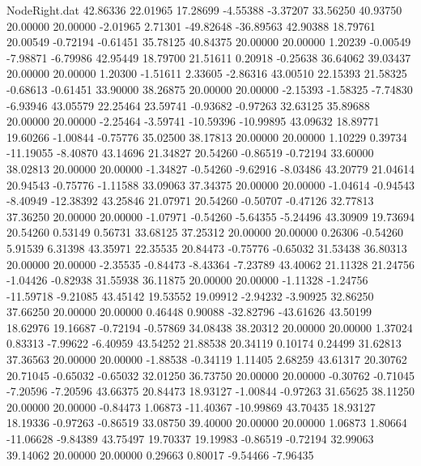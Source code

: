 \begin{filecontents}{NodeRight.dat}
  42.86336   22.01965   17.28699    -4.55388   -3.37207   33.56250   40.93750   20.00000   20.00000   -2.01965    2.71301  -49.82648  -36.89563
  42.90388   18.79761   20.00549    -0.72194   -0.61451   35.78125   40.84375   20.00000   20.00000    1.20239   -0.00549   -7.98871   -6.79986
  42.95449   18.79700   21.51611     0.20918   -0.25638   36.64062   39.03437   20.00000   20.00000    1.20300   -1.51611    2.33605   -2.86316
  43.00510   22.15393   21.58325    -0.68613   -0.61451   33.90000   38.26875   20.00000   20.00000   -2.15393   -1.58325   -7.74830   -6.93946
  43.05579   22.25464   23.59741    -0.93682   -0.97263   32.63125   35.89688   20.00000   20.00000   -2.25464   -3.59741  -10.59396  -10.99895
  43.09632   18.89771   19.60266    -1.00844   -0.75776   35.02500   38.17813   20.00000   20.00000    1.10229    0.39734  -11.19055   -8.40870
  43.14696   21.34827   20.54260    -0.86519   -0.72194   33.60000   38.02813   20.00000   20.00000   -1.34827   -0.54260   -9.62916   -8.03486
  43.20779   21.04614   20.94543    -0.75776   -1.11588   33.09063   37.34375   20.00000   20.00000   -1.04614   -0.94543   -8.40949  -12.38392
  43.25846   21.07971   20.54260    -0.50707   -0.47126   32.77813   37.36250   20.00000   20.00000   -1.07971   -0.54260   -5.64355   -5.24496
  43.30909   19.73694   20.54260     0.53149    0.56731   33.68125   37.25312   20.00000   20.00000    0.26306   -0.54260    5.91539    6.31398
  43.35971   22.35535   20.84473    -0.75776   -0.65032   31.53438   36.80313   20.00000   20.00000   -2.35535   -0.84473   -8.43364   -7.23789
  43.40062   21.11328   21.24756    -1.04426   -0.82938   31.55938   36.11875   20.00000   20.00000   -1.11328   -1.24756  -11.59718   -9.21085
  43.45142   19.53552   19.09912    -2.94232   -3.90925   32.86250   37.66250   20.00000   20.00000    0.46448    0.90088  -32.82796  -43.61626
  43.50199   18.62976   19.16687    -0.72194   -0.57869   34.08438   38.20312   20.00000   20.00000    1.37024    0.83313   -7.99622   -6.40959
  43.54252   21.88538   20.34119     0.10174    0.24499   31.62813   37.36563   20.00000   20.00000   -1.88538   -0.34119    1.11405    2.68259
  43.61317   20.30762   20.71045    -0.65032   -0.65032   32.01250   36.73750   20.00000   20.00000   -0.30762   -0.71045   -7.20596   -7.20596
  43.66375   20.84473   18.93127    -1.00844   -0.97263   31.65625   38.11250   20.00000   20.00000   -0.84473    1.06873  -11.40367  -10.99869
  43.70435   18.93127   18.19336    -0.97263   -0.86519   33.08750   39.40000   20.00000   20.00000    1.06873    1.80664  -11.06628   -9.84389
  43.75497   19.70337   19.19983    -0.86519   -0.72194   32.99063   39.14062   20.00000   20.00000    0.29663    0.80017   -9.54466   -7.96435

\end{filecontents}
